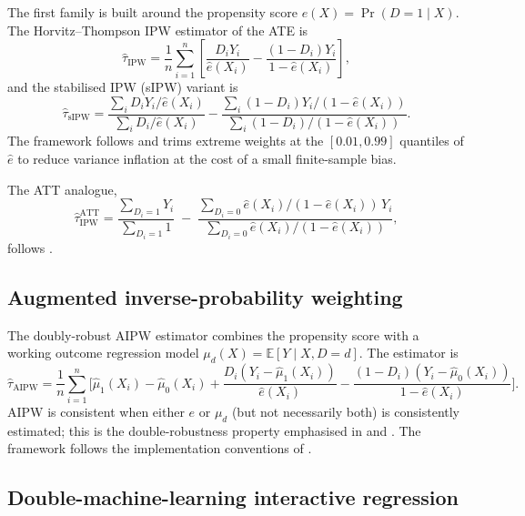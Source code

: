 \documentclass[article,shortnames,nojss]{jss}
\renewcommand{\E}{\mathbb{E}}
\begin{document}
The first family is built around the propensity score
$e(X) = \Pr(D=1 \mid X)$. The Horvitz--Thompson IPW estimator of
the ATE is
\begin{equation}
\label{eq:hipw}
\hat{\tau}_{\mathrm{IPW}} = \frac{1}{n} \sum_{i=1}^{n}
\left[
\frac{D_i Y_i}{\hat{e}(X_i)} -
\frac{(1-D_i) Y_i}{1-\hat{e}(X_i)}
\right],
\end{equation}
and the stabilised IPW (sIPW) variant is
\begin{equation}
\label{eq:sipw}
\hat{\tau}_{\mathrm{sIPW}} =
\frac{ \sum_{i} D_i Y_i / \hat{e}(X_i) }{ \sum_{i} D_i / \hat{e}(X_i) } -
\frac{ \sum_{i} (1-D_i) Y_i / (1-\hat{e}(X_i)) }{ \sum_{i} (1-D_i) / (1-\hat{e}(X_i)) }.
\end{equation}
The framework follows \citet{Cole2008} and trims extreme weights at
the $[0.01, 0.99]$ quantiles of $\hat{e}$ to reduce variance
inflation at the cost of a small finite-sample bias.

The ATT analogue,
\begin{equation}
\label{eq:att}
\hat{\tau}^{\mathrm{ATT}}_{\mathrm{IPW}} =
\frac{\sum_{D_i=1} Y_i}{\sum_{D_i=1} 1}
\;-\;
\frac{\sum_{D_i=0} \hat e(X_i)/(1-\hat e(X_i))\, Y_i}
     {\sum_{D_i=0} \hat e(X_i)/(1-\hat e(X_i))},
\end{equation}
follows \citet{ImbensRubin2015}.

\subsection{Augmented inverse-probability weighting}
\label{sec:aipw}

The doubly-robust AIPW estimator combines the propensity score with
a working outcome regression model $\mu_d(X) = \E[Y \mid X, D=d]$.
The estimator is
\begin{equation}
\label{eq:aipw}
\hat{\tau}_{\mathrm{AIPW}} = \frac{1}{n} \sum_{i=1}^{n}
\biggl[
\hat{\mu}_1(X_i) - \hat{\mu}_0(X_i)
+ \frac{D_i (Y_i - \hat{\mu}_1(X_i))}{\hat{e}(X_i)}
- \frac{(1-D_i) (Y_i - \hat{\mu}_0(X_i))}{1-\hat{e}(X_i)}
\biggr].
\end{equation}
AIPW is consistent when either $e$ or $\mu_d$ (but not necessarily
both) is consistently estimated; this is the double-robustness
property emphasised in \citet{Robins1994} and \citet{Bang2005}. The
framework follows the implementation conventions of
\citet{Funk2011}.

\subsection{Double-machine-learning interactive regression}
\label{sec:irm-dml}
\end{document}

